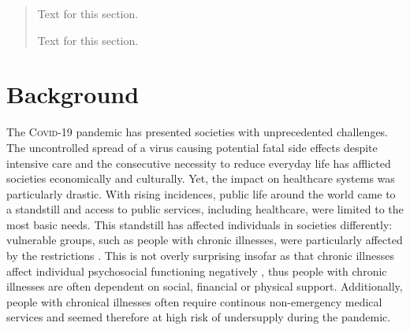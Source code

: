 \documentclass{bmcart}
\begin{document}
\begin{frontmatter}
\begin{fmbox}
\end{fmbox}%


\begin{abstractbox}

\begin{abstract} %
Text for this section.

Text for this section.
\end{abstract}


\begin{keyword}%
\end{keyword}

\end{abstractbox}

\end{frontmatter}


\section*{Background}
The \textsc{Covid}-19 pandemic has presented societies with unprecedented challenges. The uncontrolled spread of a virus causing potential fatal side effects despite intensive care and the consecutive necessity to reduce everyday life has afflicted societies economically and culturally. Yet, the impact on healthcare systems was particularly drastic. With rising incidences, public life around the world came to a standstill and access to public services, including healthcare, were limited to the most basic needs. This standstill has affected individuals in societies differently: vulnerable groups, such as people with chronic illnesses, were particularly affected by the restrictions \cite{sepulveda2020impact, kasar2021lif, yogev2021covid}. This is not overly surprising insofar as that chronic illnesses affect individual psychosocial functioning negatively \cite{demirtepe2022psychosocial}, thus people with chronic illnesses are often dependent on social, financial or physical support. Additionally, people with chronical illnesses often require continous non-emergency medical services and seemed therefore at high risk of undersupply during the pandemic. 
\end{document}
